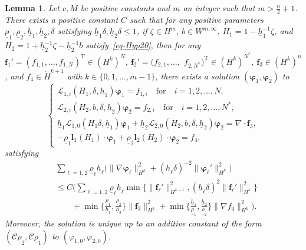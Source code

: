 \documentclass[11pt,leqno]{article}
\newtheorem{lemma}[theorem]{\bf Lemma}
\numberwithin{equation}{section}
\numberwithin{figure}{section}
\begin{document}
\begin{lemma}\label{L.elliptic}
Let $c, M$ be positive constants and $m$ an integer such that $m>\frac{n}{2}+1$. 
There exists a positive constant $C$ such that for any positive parameters 
$\underline{\rho}_1, \underline{\rho}_2, \underline{h}_1, \underline{h}_2, \delta$ satisfying 
$\underline{h}_1\delta, \underline{h}_2\delta \leq 1$, 
if $\zeta\in H^m$, $b\in W^{m,\infty}$, $H_1 = 1 - \underline{h}_1^{-1}\zeta$, 
and $H_2 = 1 + \underline{h}_2^{-1}\zeta - \underline{h}_2^{-1}b$ satisfy~\eqref{eq-Hyp20}, 
then for any $\bm{f}_1' = (f_{1,1},\ldots,f_{1,N})^\mathrm{T} \in (H^{k})^N$, 
$\bm{f}_2' = (f_{2,1},\ldots,$ $f_{2,N^*})^\mathrm{T} \in (H^{k})^{N^*}$, $\bm{f}_3 \in (H^k)^n$, 
and $f_4\in \mathring H^{k+1} $ with  $k\in\{0,1,\ldots,m-1\}$, 
there exists a solution $(\bm{\varphi}_1,\bm{\varphi}_2)$ to 
%
\begin{equation}\label{equationvarphi}
\begin{cases}
 \mathcal{L}_{1,i}(H_{1},\delta,\underline{h}_1) {\bm \varphi}_{1} =  f_{1,i} \quad\mbox{for}\quad i=1,2,\ldots,N, \\
 \mathcal{L}_{2,i}(H_{2},b,\delta,\underline{h}_2) {\bm \varphi}_{2} = f_{2,i} \quad\mbox{for}\quad i=1,2,\ldots,N^*, \\
 \underline{h}_1\mathcal{L}_{1,0}(H_{1}\delta,\underline{h}_1) {\bm \varphi}_{1}
  + \underline{h}_2\mathcal{L}_{2,0}(H_{2},b,\delta,\underline{h}_2) {\bm \varphi}_{2} = \nabla\cdot \bm{f}_3,\\
 - \underline{\rho}_1{\bm l}_1(H_1) \cdot {\bm \varphi}_1
    + \underline{\rho}_2{\bm l}_2(H_2) \cdot {\bm \varphi}_2 = f_4,
\end{cases}
\end{equation}
%
satisfying 
%
\begin{align*}
&\sum_{\ell=1,2}\underline{\rho}_\ell \underline{h}_\ell \bigl(
 \|\nabla\bm{\varphi}_\ell\|_{H^k}^2 + (\underline{h}_\ell\delta)^{-2}\|\bm{\varphi}_\ell'\|_{H^k}^2 \bigr) \\
&\leq C\biggl( \sum_{\ell=1,2}\underline{\rho}_\ell \underline{h}_\ell
 \min\bigl\{ \|\bm{f}_\ell'\|_{H^{k-1}}^2, (\underline{h}_\ell\delta)^2 \|\bm{f}_\ell'\|_{H^k}^2 \bigr\} \\
&\qquad
 + \min\biggl\{\frac{\underline{\rho}_1}{\underline{h}_1},\frac{\underline{\rho}_2}{\underline{h}_2} \biggr\}
  \|\bm{f}_3\|_{H^k}^2
 + \min\biggl\{\frac{\underline{h}_1}{\underline{\rho}_1},\frac{\underline{h}_2}{\underline{\rho}_2} \biggr\}
  \|\nabla f_4\|_{H^k}^2 \biggr).
\end{align*}
%
Moreover, the solution is unique up to an additive constant of the form 
$(\mathcal{C}\underline{\rho}_2,\mathcal{C}\underline{\rho}_1)$ to $(\varphi_{1,0},\varphi_{2,0})$. 
\end{lemma}
\end{document}
